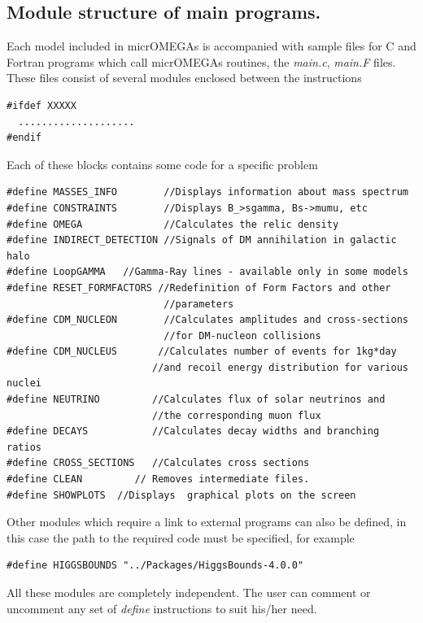 \documentclass[12pt,a4paper]{article}
\begin{document}
\subsection{Module structure of main programs.}
Each model included in micrOMEGAs  is accompanied with sample files for
C and Fortran programs which call micrOMEGAs routines, the {\it main.c}, {\it main.F} files.  
These files   consist of
several modules enclosed between the instructions
\begin{verbatim}
#ifdef XXXXX
  ....................
#endif
\end{verbatim}
Each of these blocks  contains some code for a specific problem
{\small
\begin{verbatim}
#define MASSES_INFO        //Displays information about mass spectrum 
#define CONSTRAINTS        //Displays B_>sgamma, Bs->mumu, etc
#define OMEGA              //Calculates the relic density 
#define INDIRECT_DETECTION //Signals of DM annihilation in galactic halo
#define LoopGAMMA   //Gamma-Ray lines - available only in some models
#define RESET_FORMFACTORS //Redefinition of Form Factors and other
                           //parameters 
#define CDM_NUCLEON        //Calculates amplitudes and cross-sections
                           //for DM-nucleon collisions 
#define CDM_NUCLEUS       //Calculates number of events for 1kg*day
                         //and recoil energy distribution for various nuclei
#define NEUTRINO         //Calculates flux of solar neutrinos and
                         //the corresponding muon flux 
#define DECAYS           //Calculates decay widths and branching ratios  
#define CROSS_SECTIONS   //Calculates cross sections 
#define CLEAN         // Removes intermediate files.
#define SHOWPLOTS  //Displays  graphical plots on the screen
\end{verbatim}
}
Other modules which require a link to external programs can also be defined, in this case the path to the required code must be specified, for example 

{\small
\begin{verbatim}
#define HIGGSBOUNDS "../Packages/HiggsBounds-4.0.0"
\end{verbatim}
}

All these modules are completely independent. The user can comment or
uncomment any set of {\it define} instructions to suit his/her need. 
\end{document}
